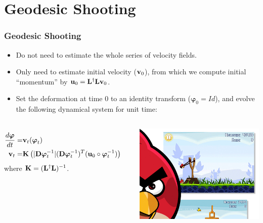 \documentclass{beamer}
\begin{document}
\section{Geodesic Shooting}

\begin{frame}
\frametitle{Geodesic Shooting}
\begin{itemize}
\item{Do not need to estimate the whole series of velocity fields.}
\item{Only need to estimate initial velocity (${\bf v}_0$), from which we compute initial ``momentum'' by ${\bf u}_0 = {\bf L}^\dagger{\bf L}{\bf v}_0$.}
\item{Set the deformation at time 0 to an identity transform (${\boldsymbol\varphi}_0 = Id$), and evolve the following dynamical system for unit time:}
\end{itemize}
\begin{columns}[c]
\begin{eqnarray*}
\frac{d {\boldsymbol\varphi}}{d t} = & {\bf v}_t ({\boldsymbol\varphi}_t)\cr
{\bf v}_{t} = & {\bf K} \left(|{\bf D}{\boldsymbol\varphi}_{t}^{-1}| ({\bf D}{\boldsymbol\varphi}_{t}^{-1})^T ({\bf u}_{0} \circ {\boldsymbol\varphi}_{t}^{-1}) \right)
\end{eqnarray*}
where ${\bf K} = ({\bf L}^\dagger{\bf L})^{-1}$.
\begin{center}
\includegraphics[width=.9\textwidth]{angry_birds}
\end{center}
\end{columns}
\end{frame}

\end{document}
